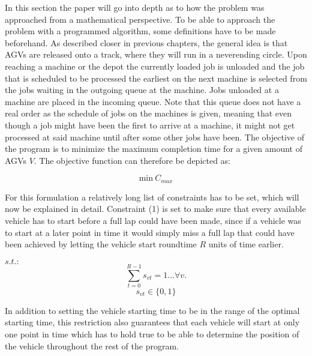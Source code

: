 In this section the paper will go into depth as to how the problem was approached from a mathematical perspective. To be able to approach the problem
with a programmed algorithm, some definitions have to be made beforehand. As described closer in previous chapters, the general idea is that AGVs
are released onto a track, where they will run in a neverending circle. Upon reaching a machine or the depot the currently loaded job is unloaded and
the job that is scheduled to be processed the earliest on the next machine is selected from the jobs waiting in the outgoing queue at the machine.
Jobs unloaded at a machine are placed in the incoming queue. Note that this queue does not have a real order as the schedule of jobs on the machines is
given, meaning that even though a job might have been the first to arrive at a machine, it might not get processed at said machine until after some
other jobs have been. The objective of the program is to minimize the maximum completion time for a given amount of AGVs \(V\). The objective function can therefore be
depicted as:

\begin{equation}
\mathrm{min}\>C_{max}
\end{equation}

For this formulation a relatively long list of constraints has to be set, which will now be explained in detail. Constraint (1) is set to make sure
that every available vehicle has to start before a full lap could have been made, since if a vehicle was to start at a later point in time it would
simply miss a full lap that could have been achieved by letting the vehicle start roundtime \(R\) units of time earlier.

\(s.t.:\)
\begin{equation}
\sum_{t=0}^{R-1}s_{v t} = 1\ldots \forall v.
\end{equation}
\begin{equation}
s_{v t}\in\{0,1\}
\end{equation}

In addition to setting the vehicle starting time to be in the range of the optimal starting time, this restriction also guarantees that each vehicle
will start at only one point in time which has to hold true to be able to determine the position of the vehicle throughout the rest of the program.